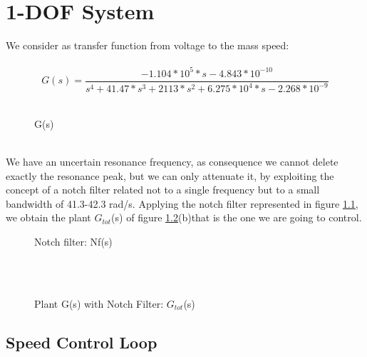 \chapter{1-DOF System}
We consider as transfer function from voltage to the mass speed:\\
\\
\[	
G(s)=
\frac{-1.104*10^{5}*s-4.843*10^{-10}}{s^4+41.47*s^{3}+2113*s^{2}+6.275*10^{4}*s-2.268*10^{-9}}
\]
\\
\begin{figure*}[h]
	\centering
	\begin{subfigure}{\columnwidth}
		
	\end{subfigure}
\end{figure*}




\begin{figure}[h]
	\centering
	\quad
	\caption{G(s)}
\end{figure}
\\
We have an uncertain resonance frequency, as consequence we cannot delete exactly the resonance peak, but we can only attenuate it, by exploiting the concept of a notch filter related not to a single frequency but to a small bandwidth of 41.3-42.3 rad/s.
\newline 
Applying the notch filter represented in figure \ref{fig:Nf}, we obtain the plant $G_{tot}$(s) of figure \ref{fig:Plant G(s)with Notch Filter1}(b)that is the one we are going to control.
\begin{figure}[h]
	\centering
	\quad
	\caption{Notch filter: Nf(s)}
	\label{fig:Nf}
\end{figure}
\\ \\
\begin{figure}[h]
	\centering
	\label{fig:Nf1}\quad
	\label{fig:Gtot}
	\caption{Plant G(s) with Notch Filter: $G_{tot}$(s)}
	\label{fig:Plant G(s)with Notch Filter1}
\end{figure}


\section{Speed Control Loop}
